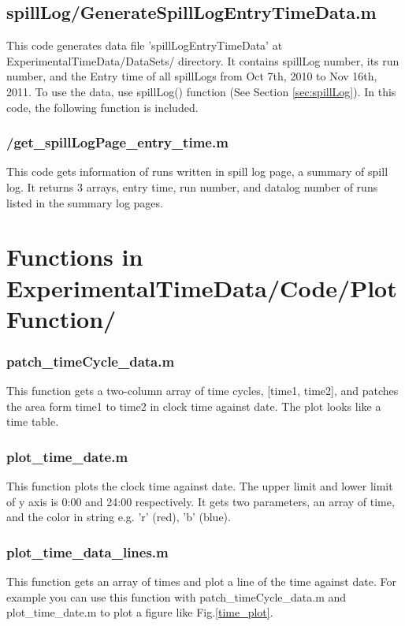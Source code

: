 \documentclass[12pt]{report}
\begin{document}
\section{spillLog/GenerateSpillLogEntryTimeData.m}
This code generates data file 'spillLogEntryTimeData' at ExperimentalTimeData/DataSets/ directory. It contains spillLog number, its run number, and the Entry time 
of all spillLogs from Oct 7th, 2010 to Nov 16th, 2011. To use the data, use spillLog() function (See Section \ref{sec:spillLog}). In this code, the following function is included.

\subsection{/get\_spillLogPage\_entry\_time.m}
This code gets information of runs written in spill log page, a summary of spill log. It returns 3 arrays, entry time, run number, and datalog number of runs listed in the summary log pages.

\chapter{Functions in ExperimentalTimeData/Code/PlotFunction/}

\subsection{patch\_timeCycle\_data.m}
This function gets a two-column array of time cycles, [time1, time2], and patches the area form time1 to time2 in clock time against date. The plot looks like a time table. 

\subsection{plot\_time\_date.m}
This function plots the clock time against date. The upper limit and lower limit of y axis is 0:00 and 24:00 respectively. It gets two parameters, an array of time, and the color in string e.g. 'r' (red), 'b' (blue).

\subsection{plot\_time\_data\_lines.m}
This function gets an array of times and plot a line of the time against date. For example you can use this function with patch\_timeCycle\_data.m and plot\_time\_date.m to plot a figure like Fig.\ref{time_plot}.
\end{document}
